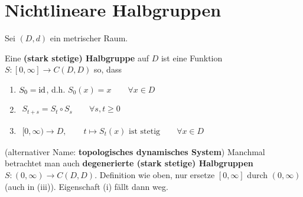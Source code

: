 
\chapter{Nichtlineare Halbgruppen} %
\setcounter{section}{1}
Sei $(D,d)$ ein metrischer Raum.

\begin{definition}
Eine \textbf{(stark stetige) Halbgruppe} auf $D$ ist eine Funktion\\ $S:[0,\infty]\to C(D,D)$ so, dass 
\begin{enumerate}[label=(\roman*)]
\item $S_0=\operatorname{id}$, d.h. $S_0(x)=x\qquad\forall x\in D$
\item $\begin{aligned}
S_{t+s}=S_t\circ S_s\qquad\forall s,t\geq0
\end{aligned}$
\item $\begin{aligned}
[0,\infty)\to D,\qquad t\mapsto S_t(x)\text{ ist stetig}\qquad\forall x\in D
\end{aligned}$
\end{enumerate}
(alternativer Name: \textbf{topologisches dynamisches System})\nl
Manchmal betrachtet man auch \textbf{degenerierte (stark stetige) Halbgruppen}\\ $S\colon (0,\infty)\to C(D,D)$. Definition wie oben, nur ersetze $[0,\infty]$ durch $(0,\infty)$ (auch in (iii)). Eigenschaft (i) fällt dann weg.
\end{definition}

